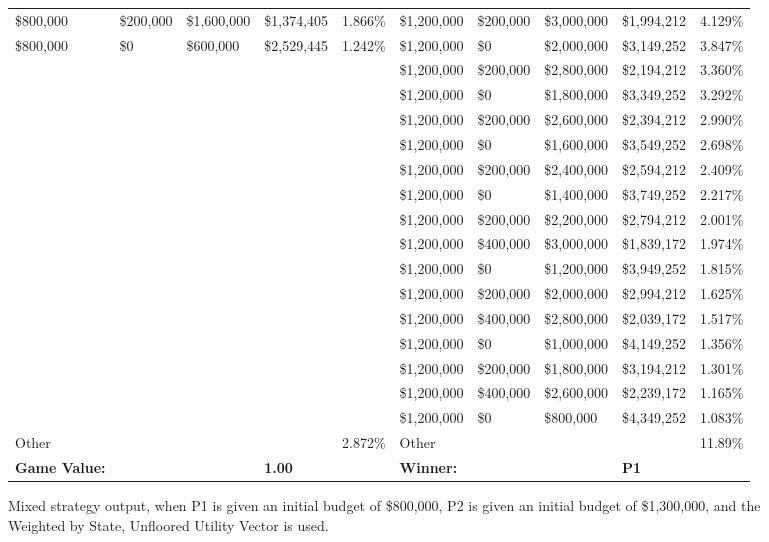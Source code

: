 \documentclass[11pt]{article}
\begin{document}
\begin{figure}
\begin{tabular}{ |p{1.0cm}p{1.0cm}p{1.0cm}p{2.0cm}|p{1.0cm}||p{1.0cm}p{1.0cm}p{1.0cm}p{2.0cm}|p{1.0cm}|}
\$800,000 & \$200,000 & \$1,600,000 & \$1,374,405 & 1.866\% & \$1,200,000 & \$200,000 & \$3,000,000 & \$1,994,212 & 4.129\% \\
\$800,000 & \$0 & \$600,000 & \$2,529,445 & 1.242\% & \$1,200,000 & \$0 & \$2,000,000 & \$3,149,252 & 3.847\% \\
&  &  &  &  & \$1,200,000 & \$200,000 & \$2,800,000 & \$2,194,212 & 3.360\% \\
&  &  &  &  & \$1,200,000 & \$0 & \$1,800,000 & \$3,349,252 & 3.292\% \\
&  &  &  &  & \$1,200,000 & \$200,000 & \$2,600,000 & \$2,394,212 & 2.990\% \\
&  &  &  &  & \$1,200,000 & \$0 & \$1,600,000 & \$3,549,252 & 2.698\% \\
&  &  &  &  & \$1,200,000 & \$200,000 & \$2,400,000 & \$2,594,212 & 2.409\% \\
&  &  &  &  & \$1,200,000 & \$0 & \$1,400,000 & \$3,749,252 & 2.217\% \\
&  &  &  &  & \$1,200,000 & \$200,000 & \$2,200,000 & \$2,794,212 & 2.001\% \\
&  &  &  &  & \$1,200,000 & \$400,000 & \$3,000,000 & \$1,839,172 & 1.974\% \\
&  &  &  &  & \$1,200,000 & \$0 & \$1,200,000 & \$3,949,252 & 1.815\% \\
&  &  &  &  & \$1,200,000 & \$200,000 & \$2,000,000 & \$2,994,212 & 1.625\% \\
&  &  &  &  & \$1,200,000 & \$400,000 & \$2,800,000 & \$2,039,172 & 1.517\% \\
&  &  &  &  & \$1,200,000 & \$0 & \$1,000,000 & \$4,149,252 & 1.356\% \\
&  &  &  &  & \$1,200,000 & \$200,000 & \$1,800,000 & \$3,194,212 & 1.301\% \\
&  &  &  &  & \$1,200,000 & \$400,000 & \$2,600,000 & \$2,239,172 & 1.165\% \\
&  &  &  &  & \$1,200,000 & \$0 & \$800,000 & \$4,349,252 & 1.083\% \\
\hline
Other &  &  &  & 2.872\% & Other &  &  &  & 11.89\% \\
\hline
\small \textbf{Game Value:} &&& \small \textbf{1.00} && \small \textbf{Winner:} &&& \small \textbf{P1}&\\
\hline
\end{tabular}
\caption{Mixed strategy output, when P1 is given an initial budget of \$800,000, P2 is given an initial budget of \$1,300,000, and the Weighted by State, Unfloored Utility Vector is used.}
\label{8v13table.5}
\end{figure}
\end{document}
